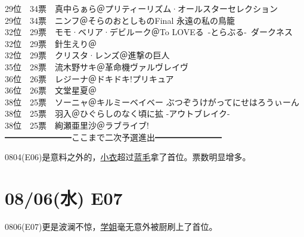 { 29位　34票　真中らぁら＠プリティーリズム·オールスターセレクション\\
 29位　34票　ニンフ＠そらのおとしものFinal 永遠の私の鳥籠\\
 32位　29票　モモ·ベリア·デビルーク＠To LOVEる~-とらぶる-~ダークネス\\
 32位　29票　針生えり＠\Saki\\
 32位　29票　クリスタ·レンズ＠進撃の巨人\\
 35位　28票　流木野サキ＠革命機ヴァルヴレイヴ\\
 36位　26票　レジーナ＠ドキドキ!プリキュア\\
 36位　26票　文堂星夏＠\Saki\\
 38位　25票　ソーニャ＠キルミーベイベー ぶつぞうけがってにせはろうぃーん\\
 38位　25票　羽入＠ひぐらしのなく頃に拡 -アウトブレイク-\\
 38位　25票　絢瀬亜里沙＠ラブライブ!\\
 ━━━━━━━━ここまで二次予選進出━━━━━━━━
}

0804(E06)是意料之外的，\uline{小衣}超过\uline{蓝毛}拿了首位。票数明显增多。

\section{08/06(水) E07}


0806(E07)更是波澜不惊，\uline{学姐}毫无意外被厨刷上了首位。

